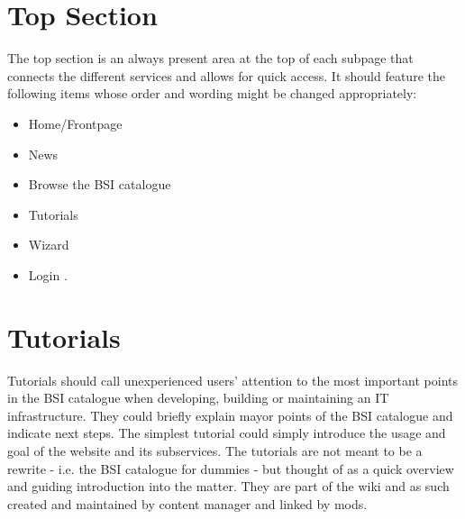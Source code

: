 \section{Top Section}
\label{top_section}

The top section is an always present area at the top of each subpage that connects the different services and allows for quick access.
It should feature the following items whose order and wording might be changed appropriately:
\begin{itemize}
    \item Home/Frontpage
    \item News
    \item Browse the BSI catalogue
    \item Tutorials
    \item Wizard
    \item Login
        .
\end{itemize}

\section{Tutorials}
\label{tutorials}

Tutorials should call unexperienced users' attention to the most important points in the BSI catalogue when developing, building or maintaining an IT infrastructure.
They could briefly explain mayor points of the BSI catalogue and indicate next steps.
The simplest tutorial could simply introduce the usage and goal of the website and its subservices.
The tutorials are not meant to be a rewrite - i.e. the BSI catalogue for dummies - but thought of as a quick overview and guiding introduction into the matter.
They are part of the wiki and as such created and maintained by content manager and linked by mods.
